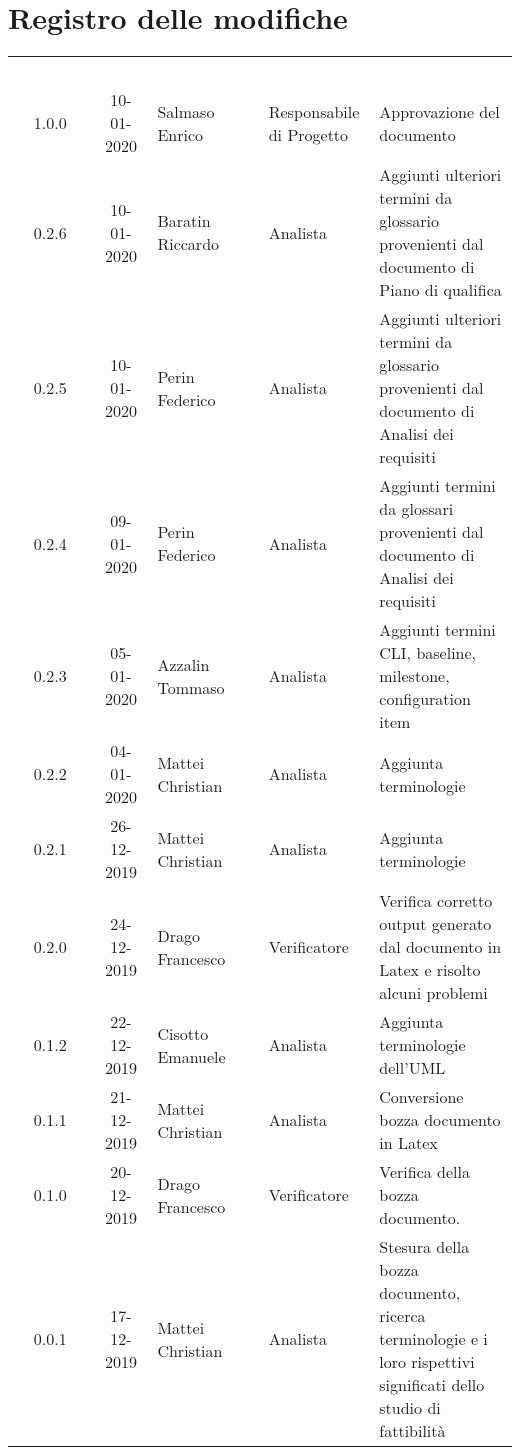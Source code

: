 \section*{Registro delle modifiche}
{
\renewcommand{\arraystretch}{1.5}
\centering
\begin{longtable}{ c c  C{4cm}  C{3cm} C{4cm}}
\textcolor{white}{\textbf{Versione}} & \textcolor{white}{\textbf{Data}} & \textcolor{white}{\textbf{Nominativo}} & \textcolor{white}{\textbf{Ruolo}} & \textcolor{white}{\textbf{Descrizione}}\\	


1.0.0 & 10-01-2020 & Salmaso Enrico & Responsabile di Progetto & Approvazione del documento \\

0.2.6 & 10-01-2020 & Baratin Riccardo & Analista & Aggiunti ulteriori termini da glossario provenienti dal documento di Piano di qualifica \\

0.2.5 & 10-01-2020 & Perin Federico & Analista & Aggiunti ulteriori termini da glossario provenienti dal documento di Analisi dei requisiti \\

0.2.4 & 09-01-2020 & Perin Federico & Analista & Aggiunti termini da glossari provenienti dal documento di Analisi dei requisiti \\

0.2.3 & 05-01-2020 & Azzalin Tommaso & Analista & Aggiunti termini CLI, baseline, milestone, configuration item \\

0.2.2 & 04-01-2020 & Mattei Christian & Analista & Aggiunta terminologie \\

0.2.1 & 26-12-2019 & Mattei Christian & Analista & Aggiunta terminologie \\

0.2.0 & 24-12-2019 & Drago Francesco & Verificatore & Verifica corretto output generato dal documento in Latex e risolto alcuni problemi\\

0.1.2 & 22-12-2019 & Cisotto Emanuele & Analista & Aggiunta terminologie dell'UML \\

0.1.1 & 21-12-2019 & Mattei Christian & Analista & Conversione bozza documento in Latex\\
		
0.1.0 & 20-12-2019 & Drago Francesco & Verificatore & Verifica della bozza documento.  \\
		
0.0.1 & 17-12-2019 & Mattei Christian & Analista & Stesura della bozza documento, ricerca terminologie e i loro rispettivi significati dello studio di fattibilità \\
		
\end{longtable}
}